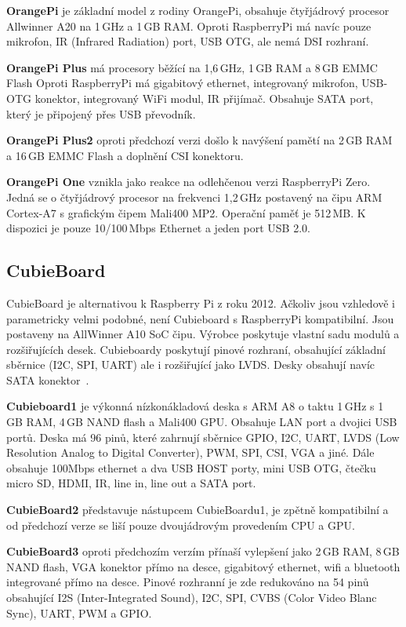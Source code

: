 		\textbf{OrangePi} je základní model z rodiny OrangePi, obsahuje čtyřjádrový procesor Allwinner A20 na 1\,GHz a 1\,GB RAM. Oproti RaspberryPi má navíc pouze mikrofon, IR (Infrared Radiation) port, USB OTG, ale nemá DSI rozhraní.
		
		\textbf{OrangePi Plus } má procesory běžící na 1,6\,GHz, 1\,GB RAM a 8\,GB EMMC Flash Oproti  RaspberryPi má gigabitový ethernet, integrovaný mikrofon, USB-OTG konektor, integrovaný WiFi modul, IR přijímač. Obsahuje SATA port, který je připojený přes USB převodník.
		
		\textbf{OrangePi Plus2} oproti předchozí verzi došlo k navýšení pamětí na 2\,GB RAM a 16\,GB EMMC Flash a doplnění CSI konektoru.
		
		\textbf{OrangePi One} vznikla jako reakce na odlehčenou verzi RaspberryPi Zero. Jedná se o čtyřjádrový procesor na frekvenci 1,2\,GHz postavený na čipu ARM Cortex-A7 s grafickým čipem Mali400 MP2. Operační paměť je 512\,MB. K dispozici je pouze 10/100\,Mbps Ethernet a jeden port USB 2.0.


	\subsection{CubieBoard}
	\label{KapCubie}
			CubieBoard je alternativou k Raspberry Pi z roku 2012. Ačkoliv jsou vzhledově i parametricky velmi podobné, není Cubieboard s RaspberryPi kompatibilní. Jsou postaveny na AllWinner A10 SoC čipu. Výrobce poskytuje vlastní sadu modulů a rozšiřujících desek. Cubieboardy poskytují pinové rozhraní, obsahující základní sběrnice (I2C, SPI, UART) ale i rozšiřující jako LVDS. Desky obsahují navíc SATA konektor~\cite{CubieBoards}.
	
	\textbf{Cubieboard1} je výkonná nízkonákladová deska s ARM A8 o taktu 1\,GHz s 1\,GB RAM, 4\,GB NAND flash a Mali400 GPU. Obsahuje LAN port a dvojici USB portů. Deska má 96 pinů, které zahrnují sběrnice GPIO, I2C, UART, LVDS (Low Resolution Analog to Digital Converter), PWM, SPI, CSI, VGA a jiné. Dále obsahuje 100Mbps ethernet a dva USB HOST porty, mini USB OTG, čtečku micro SD, HDMI, IR, line in, line out a SATA port.
	
	\textbf{CubieBoard2} představuje nástupcem CubieBoardu1, je zpětně kompatibilní a od předchozí verze se liší pouze dvoujádrovým provedením CPU a GPU.
		
	\textbf{CubieBoard3} oproti předchozím verzím přínaší vylepšení jako 2\,GB RAM, 8\,GB NAND flash, VGA konektor přímo na desce, gigabitový ethernet, wifi a bluetooth integrované přímo na desce. Pinové rozhranní je zde redukováno na 54 pinů obsahující I2S (Inter-Integrated Sound), I2C, SPI, CVBS (Color Video Blanc Sync), UART, PWM a GPIO.
	
